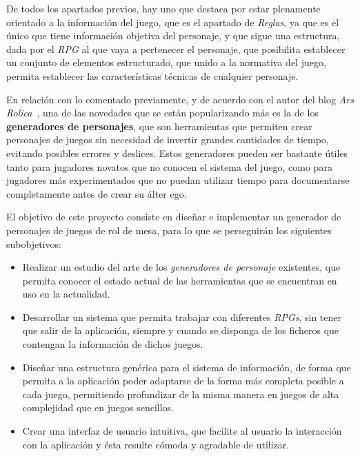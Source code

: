 De todos los apartados previos, hay uno que destaca por estar plenamente orientado a la información del juego, que es el apartado 
de \textit{Reglas}, ya que es el único que tiene información objetiva del personaje, y que sigue una estructura, dada por el 
\textit{RPG} al que vaya a pertenecer el personaje, que posibilita establecer un conjunto de elementos estructurado, que unido a la
normativa del juego, permita establecer las características técnicas de cualquier personaje. \medskip

En relación con lo comentado previamente, y de acuerdo con el autor del blog \textit{Ars Rolica}~\autocite*{ArsRolica}, 
una de las novedades que se están popularizando más es la de los \textbf{generadores de personajes}, que son herramientas que permiten 
crear personajes de juegos sin necesidad de invertir grandes cantidades de tiempo, evitando posibles errores y deslices. 
Estos generadores pueden ser bastante útiles tanto para jugadores novatos que no conocen el sistema del juego, como para 
jugadores más experimentados que no puedan utilizar tiempo para documentarse completamente antes de crear su álter ego. \medskip

El objetivo de este proyecto consiste en diseñar e implementar un generador de personajes de juegos de rol de mesa, para lo que se 
perseguirán los siguientes subobjetivos:
\begin{itemize}
    \item Realizar un estudio del arte de los \textit{generadores de personaje} existentes, que permita conocer el estado actual de las herramientas
    que se encuentran en uso en la actualidad.

    \item Desarrollar un sistema que permita trabajar con diferentes \textit{RPGs}, sin tener que salir de la aplicación, siempre y 
    cuando se disponga de los ficheros que contengan la información de dichos juegos.

    \item Diseñar una estructura genérica para el sistema de información, de forma que permita a la aplicación poder adaptarse de la forma más completa posible a 
    cada juego, permitiendo profundizar de la misma manera en juegos de alta complejidad que en juegos sencillos.

    \item Crear una interfaz de usuario intuitiva, que facilite al usuario la interacción con la aplicación y ésta resulte cómoda y 
    agradable de utilizar.

\end{itemize}